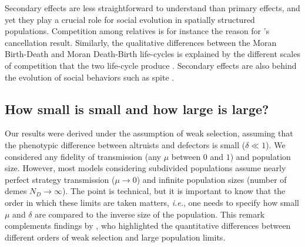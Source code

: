 \documentclass[11pt, letterpaper]{article}
\newcommand{\ie}{\textit{i.e.}}
\newcommand{\bb}{\mathsf{b}}
\newcommand{\cc}{\mathsf{c}}
\newcommand{\out}{\textrm{out}}
\newcommand{\Qout}{Q_{\out}}
\newcommand{\ndemes}{N_D}
\newcommand{\selstr}{\delta}
\begin{document}

Secondary effects are less straightforward to understand than primary effects, and yet they play a crucial role for social evolution in spatially structured populations. Competition among relatives is for instance the reason for \citet{Taylor1992}'s cancellation result. Similarly, the qualitative differences between the Moran Birth-Death and Moran Death-Birth life-cycles is explained by the different scales of competition that the two life-cycle produce \citep{GrafenArchetti2008, DebarreHD2014}. Secondary effects are also behind the evolution of social behaviors such as spite \citep{WestGardner2010}. 


\subsection*{How small is small and how large is large?}
Our results were derived under the assumption of weak selection, assuming that the phenotypic difference between altruists and defectors is small ($\selstr \ll 1$). We considered any fidelity of transmission (any $\mu$ between $0$ and $1$) and population size. However, most models considering subdivided populations assume nearly perfect strategy transmission ($\mu \to 0$) and infinite population sizes (number of demes $\ndemes \to \infty$). The point is technical, but it is important to know that the order in which these limits are taken matters, \ie, one needs to specify how small $\mu$ and $\selstr$ are compared to the inverse size of the population. This remark complements findings by \citet{SampleAllen2017}, who highlighted the quantitative differences between different orders of weak selection and large population limits. 
\end{document}

